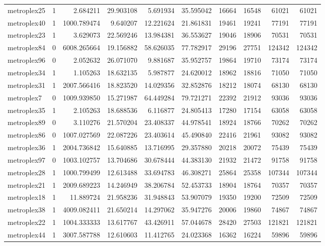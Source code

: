 \begin{longtable}{|l|r|r|r|r|r|r|r|r|r|}
metroplex25 & 1 & 2.684211 & 29.903108 & 5.691934 & 35.595042 & 16664 & 16548 & 61021 & 61021 \\
metroplex40 & 1 & 1000.789474 & 9.640207 & 12.221624 & 21.861831 & 19461 & 19241 & 77191 & 77191 \\
metroplex23 & 1 & 3.629073 & 22.569246 & 13.984381 & 36.553627 & 19046 & 18906 & 70531 & 70531 \\
metroplex84 & 0 & 6008.265664 & 19.156882 & 58.626035 & 77.782917 & 29196 & 27751 & 124342 & 124342 \\
metroplex96 & 0 & 2.052632 & 26.071070 & 9.881687 & 35.952757 & 19864 & 19710 & 73174 & 73174 \\
metroplex34 & 1 & 1.105263 & 18.632135 & 5.987877 & 24.620012 & 18962 & 18816 & 71050 & 71050 \\
metroplex31 & 1 & 2007.566416 & 18.823520 & 14.029356 & 32.852876 & 18212 & 18074 & 68130 & 68130 \\
metroplex7 & 0 & 1009.939850 & 15.271987 & 64.449284 & 79.721271 & 22392 & 21912 & 93036 & 93036 \\
metroplex35 & 1 & 2.105263 & 18.688536 & 6.116877 & 24.805413 & 17280 & 17154 & 63058 & 63058 \\
metroplex89 & 0 & 3.110276 & 21.570204 & 23.408337 & 44.978541 & 18924 & 18766 & 70262 & 70262 \\
metroplex86 & 0 & 1007.027569 & 22.087226 & 23.403614 & 45.490840 & 22416 & 21961 & 93082 & 93082 \\
metroplex36 & 1 & 2004.736842 & 15.640885 & 13.716995 & 29.357880 & 20218 & 20072 & 75439 & 75439 \\
metroplex97 & 0 & 1003.102757 & 13.704686 & 30.678444 & 44.383130 & 21932 & 21472 & 91758 & 91758 \\
metroplex28 & 1 & 1000.799499 & 12.613488 & 33.694783 & 46.308271 & 25864 & 25358 & 107344 & 107344 \\
metroplex21 & 1 & 2009.689223 & 14.246949 & 38.206784 & 52.453733 & 18904 & 18764 & 70357 & 70357 \\
metroplex18 & 1 & 11.889724 & 21.958236 & 31.948843 & 53.907079 & 19350 & 19200 & 72509 & 72509 \\
metroplex38 & 1 & 4009.082411 & 21.650214 & 14.297062 & 35.947276 & 20006 & 19860 & 74867 & 74867 \\
metroplex22 & 1 & 1004.333333 & 13.617767 & 43.426911 & 57.044678 & 28420 & 27503 & 121821 & 121821 \\
metroplex44 & 1 & 3007.587788 & 12.610603 & 11.412765 & 24.023368 & 16362 & 16224 & 59896 & 59896 \\

\end{longtable}
